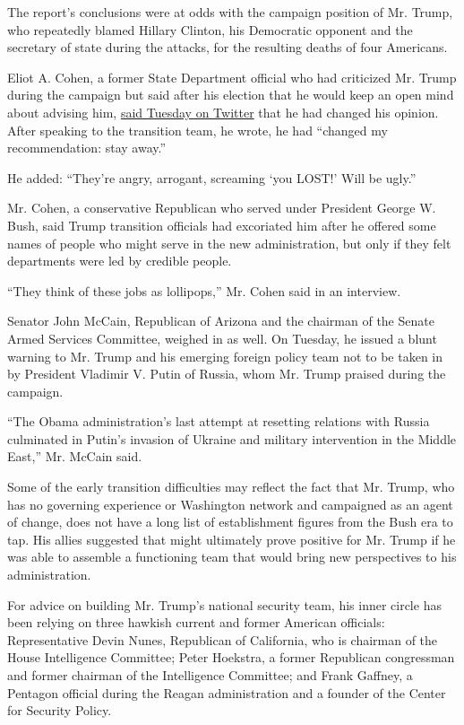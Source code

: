 The report's conclusions were at odds with the campaign position of Mr.
Trump, who repeatedly blamed Hillary Clinton, his Democratic opponent
and the secretary of state during the attacks, for the resulting deaths
of four Americans.

Eliot A. Cohen, a former State Department official who had criticized
Mr. Trump during the campaign but said after his election that he would
keep an open mind about advising him,
\href{https://twitter.com/EliotACohen/status/798512852931788800}{said
Tuesday on Twitter} that he had changed his opinion. After speaking to
the transition team, he wrote, he had ``changed my recommendation: stay
away.''

He added: ``They're angry, arrogant, screaming `you LOST!' Will be
ugly.''

Mr. Cohen, a conservative Republican who served under President George
W. Bush, said Trump transition officials had excoriated him after he
offered some names of people who might serve in the new administration,
but only if they felt departments were led by credible people.

``They think of these jobs as lollipops,'' Mr. Cohen said in an
interview.

Senator John McCain, Republican of Arizona and the chairman of the
Senate Armed Services Committee, weighed in as well. On Tuesday, he
issued a blunt warning to Mr. Trump and his emerging foreign policy team
not to be taken in by President Vladimir V. Putin of Russia, whom Mr.
Trump praised during the campaign.

``The Obama administration's last attempt at resetting relations with
Russia culminated in Putin's invasion of Ukraine and military
intervention in the Middle East,'' Mr. McCain said.

Some of the early transition difficulties may reflect the fact that Mr.
Trump, who has no governing experience or Washington network and
campaigned as an agent of change, does not have a long list of
establishment figures from the Bush era to tap. His allies suggested
that might ultimately prove positive for Mr. Trump if he was able to
assemble a functioning team that would bring new perspectives to his
administration.

For advice on building Mr. Trump's national security team, his inner
circle has been relying on three hawkish current and former American
officials: Representative Devin Nunes, Republican of California, who is
chairman of the House Intelligence Committee; Peter Hoekstra, a former
Republican congressman and former chairman of the Intelligence
Committee; and Frank Gaffney, a Pentagon official during the Reagan
administration and a founder of the Center for Security Policy.

